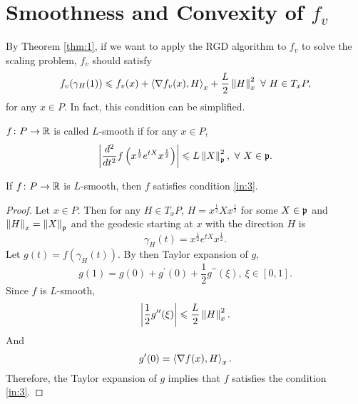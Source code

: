 \documentclass[suri,pdfbookmark]{engsuribt} %
\begin{document}
  \section{Smoothness and Convexity of \texorpdfstring{$f_v$}{fv}}

  By Theorem \ref{thm:1}, if we want to apply the RGD algorithm to $f_v$ to solve the scaling problem, $f_v$ should satisfy
  \begin{equation*}
    f_v(\gamma_H(1)) \leqslant f_v(x) + \left\langle \nabla f_v(x),H \right\rangle_x + \frac{L}{2}\left\lVert H\right\lVert_x^2~\forall~H \in T_xP, 
  \end{equation*}
  for any $x \in P$. In fact, this condition can be simplified.

  \begin{defn}
    $f \colon P \rightarrow \mathbb{R}$ is called $L$-smooth if for any $x \in P$,
      \begin{equation*}
        \left\lvert\frac{d^2}{dt^2}f\left(x^{\frac{1}{2}}e^{tX}x^{\frac{1}{2}}\right)\right\lvert \leqslant L\left\lVert X\right\lVert_{\mathfrak{p}}^2,~\forall~X \in \mathfrak{p}.
      \end{equation*}
  \end{defn}

  \begin{prop}
    If $f \colon P \rightarrow \mathbb{R}$ is $L$-smooth, then $f$ satisfies condition \ref{in:3}.
  \end{prop}
  \begin{proof}
    Let $x \in P$. Then for any $H \in T_xP$, $H = x^{\frac{1}{2}}Xx^{\frac{1}{2}}$ for some $X \in \mathfrak{p}$ and $\left\lVert H\right\lVert_x = \left\lVert X\right\lVert_{\mathfrak{p}}$ and the geodesic starting at $x$ with the direction $H$ is
    \begin{equation*}
      \gamma_H(t) = x^{\frac{1}{2}}e^{tX}x^{\frac{1}{2}}.
    \end{equation*}
    Let $g(t) = f(\gamma_H(t))$. By then Taylor expansion of $g$,
    \begin{equation*}
      g(1) = g(0) + g^{\prime}(0) +\frac{1}{2}g^{\prime\prime}(\xi),~\xi \in [0,1].
    \end{equation*}
    Since $f$ is $L$-smooth,
    \begin{equation*}
      \left\lvert\frac{1}{2}g^{\prime\prime}(\xi)\right\lvert \leqslant \frac{L}{2}\left\lVert H\right\lVert_{x}^2.
    \end{equation*}
    And
    \begin{equation*}
       g^{\prime}(0) =  \left\langle \nabla f(x),H \right\rangle_x.
    \end{equation*}
    Therefore, the Taylor expansion of $g$ implies that $f$ satisfies the condition \ref{in:3}.
  \end{proof}
\end{document}
